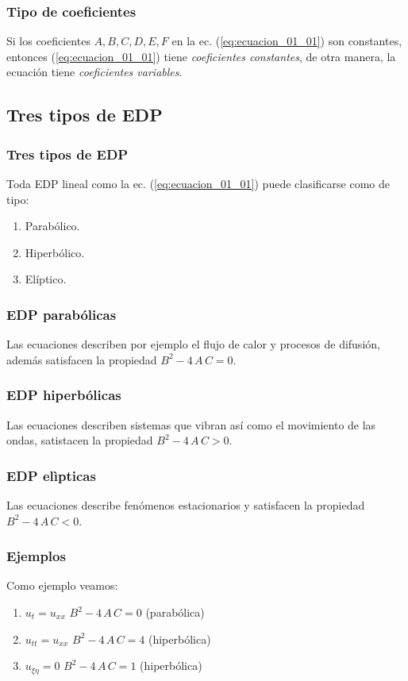 \documentclass[12pt]{beamer}
\begin{document}
\begin{frame}
\frametitle{Tipo de coeficientes}
Si los coeficientes $A, B, C, D, E, F$ en la ec. (\ref{eq:ecuacion_01_01}) son constantes, entonces (\ref{eq:ecuacion_01_01}) tiene \emph{coeficientes constantes}, de otra manera, la ecuación tiene \emph{coeficientes variables}.
\end{frame}

\subsection{Tres tipos de EDP}

\begin{frame}
\frametitle{Tres tipos de EDP}
Toda EDP lineal como la ec. (\ref{eq:ecuacion_01_01}) puede clasificarse como de tipo:
\begin{enumerate}[<+->]
\item Parabólico.
\item Hiperbólico.
\item Elíptico.
\end{enumerate}
\end{frame}
\begin{frame}
\frametitle{EDP parabólicas}
Las ecuaciones  describen por ejemplo el flujo de calor y procesos de difusión, además satisfacen la propiedad $B^{2} - 4 \, A \, C = 0$.
\end{frame}
\begin{frame}
\frametitle{EDP hiperbólicas}
Las ecuaciones  describen sistemas que vibran así como el movimiento de las ondas, satistacen la propiedad $B^{2} - 4 \, A \, C > 0$.
\end{frame}
\begin{frame}
\frametitle{EDP elìpticas}
Las ecuaciones  describe fenómenos estacionarios y satisfacen la propiedad $B^{2} - 4 \, A \, C < 0$.
\end{frame}
\begin{frame}
\frametitle{Ejemplos}
Como ejemplo veamos:
\pause
{}
\begin{enumerate}[<+->]
\setlength\itemsep{1em}
\item $u_{t} = u_{xx}$ \hspace{1cm} $B^{2} - 4 \, A \, C = 0$ \hspace{1cm} (parabólica)
\item $u_{tt} = u_{xx}$ \hspace{0.8cm} $B^{2} - 4 \, A \, C = 4$ \hspace{1cm} (hiperbólica)
\item $u_{\xi \eta} = 0$ \hspace{1cm} $B^{2} - 4 \, A \, C = 1$ \hspace{1cm} (hiperbólica)
\seti
\end{enumerate}
\end{frame}
\end{document}
